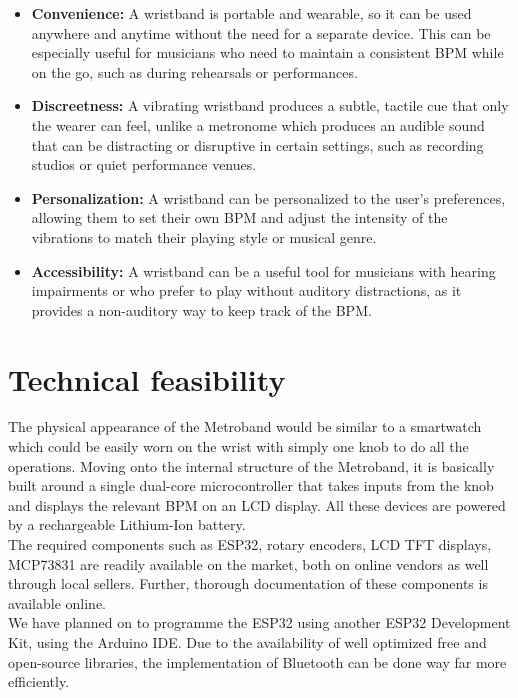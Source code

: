 \documentclass{article}
\begin{document}
        \begin{itemize}
                \item \textbf{Convenience:} A wristband is portable and wearable, so it can be used anywhere and anytime without the need for a separate device. This can be especially useful for musicians who need to maintain a consistent BPM while on the go, such as during rehearsals or performances.
                \item \textbf{Discreetness:} A vibrating wristband produces a subtle, tactile cue that only the wearer can feel, unlike a metronome which produces an audible sound that can be distracting or disruptive in certain settings, such as recording studios or quiet performance venues.
                \item \textbf{Personalization:} A wristband can be personalized to the user's preferences, allowing them to set their own BPM and adjust the intensity of the vibrations to match their playing style or musical genre.
                \item \textbf{Accessibility:} A wristband can be a useful tool for musicians with hearing impairments or who prefer to play without auditory distractions, as it provides a non-auditory way to keep track of the BPM.
        \end{itemize}

        \section{Technical feasibility}
        The physical appearance of the Metroband would be similar to a smartwatch which could be easily worn on the wrist with simply one knob to do all the operations. Moving onto the internal structure of the Metroband, it is basically built around a single dual-core microcontroller that takes inputs from the knob and displays the relevant BPM on an LCD display. All these devices are powered by a rechargeable Lithium-Ion battery.\\
        
        The required components such as ESP32, rotary encoders, LCD TFT displays, MCP73831 are readily available on the market, both on online vendors as well through local sellers. Further, thorough documentation of these components is available online.\\
        
        We have planned on to programme the ESP32 using another ESP32 Development Kit, using the Arduino IDE. Due to the availability of well optimized free and open-source libraries, the implementation of Bluetooth can be done way far more efficiently.
\end{document}
